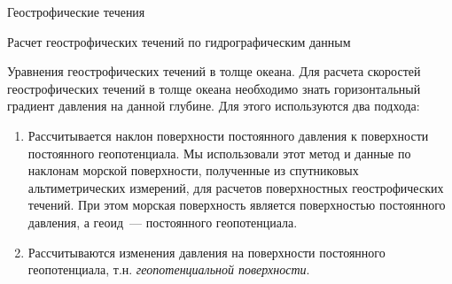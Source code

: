 \begin{chapter}{Геострофические течения}
\begin{section}{Расчет геострофических течений по гидрографическим данным}
\begin{paragraph}{Уравнения геострофических течений в толще океана.}
%
Для расчета скоростей геострофических течений в толще океана
необходимо знать горизонтальный градиент давления на данной
глубине. Для этого используются два подхода:
%
\begin{enumerate}
\item
Рассчитывается наклон поверхности постоянного давления к поверхности
постоянного геопотенциала. Мы использовали этот метод и данные по
наклонам морской поверхности, полученные из спутниковых
альтиметрических измерений, для расчетов поверхностных геострофических
течений. При этом морская поверхность является поверхностью
постоянного давления, а геоид~--- постоянного геопотенциала.
%

\item
Рассчитываются изменения давления на поверхности постоянного
геопотенциала, т.н. 
\emph{геопотенциальной поверхности}.
%
\end{enumerate}


\end{paragraph}
\end{section}
\end{chapter}
